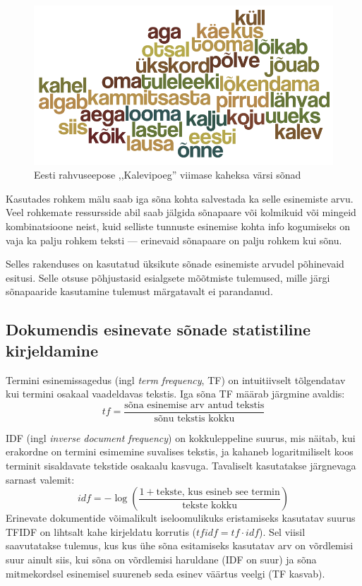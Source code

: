 \documentclass[]{trkuur}
\let\eng\emph
\begin{document}
\begin{figure}[h!]
\includegraphics[width=0.9\linewidth]{klpgv}
\caption{Eesti rahvuseepose ,,Kalevipoeg'' viimase kaheksa värsi sõnad}
\label{klpgv}
\end{figure}

Kasutades rohkem mälu saab iga sõna kohta salvestada ka selle esinemiste arvu.
Veel rohkemate ressursside abil saab jälgida sõnapaare või kolmikuid või mingeid
kombinatsioone neist, kuid selliste tunnuste esinemise kohta info kogumiseks on
vaja ka palju rohkem teksti --- erinevaid sõnapaare on palju rohkem kui sõnu.

Selles rakenduses on kasutatud üksikute sõnade esinemiste arvudel põhinevaid
esitusi. Selle otsuse põhjustasid esialgsete mõõtmiste tulemused, mille järgi
sõnapaaride kasutamine tulemust märgatavalt ei parandanud.

\subsection{Dokumendis esinevate sõnade statistiline kirjeldamine}
\label{tfsec}
Termini esinemissagedus (ingl \eng{term frequency}, TF) on intuitiivselt
tõlgendatav kui termini osakaal vaadeldavas tekstis.
Iga sõna TF määrab järgmine avaldis:
\[ tf = \frac{\text{sõna esinemise arv antud tekstis}}{\text{sõnu tekstis
kokku}} \]
\autocite{wiki-term-frequency}
\autocite{peroneTF}

\label{tfidfsec}
IDF (ingl \eng{inverse document frequency}) 
on kokkuleppeline suurus, mis näitab, kui erakordne on termini esimemine suvalises
tekstis, ja kahaneb logaritmiliselt koos terminit sisaldavate tekstide osakaalu
kasvuga.
Tavaliselt kasutatakse järgnevaga sarnast valemit:
\[ idf = -\log \left(\frac{1+\text{tekste, kus esineb see termin}}{\text{tekste kokku}} \right) \] 
Erinevate dokumentide võimalikult iseloomulikuks eristamiseks kasutatav suurus
TFIDF on lihtsalt kahe kirjeldatu korrutis (\(tfidf = tf \cdot idf \)).
Sel viisil saavutatakse tulemus, kus kus ühe sõna esitamiseks kasutatav arv on
võrdlemisi suur ainult siis, kui sõna on võrdlemisi haruldane (IDF on suur) ja
sõna mitmekordsel esinemisel suureneb seda esinev väärtus veelgi (TF kasvab).
\autocite{wiki-term-frequency}
\autocite{peroneTFIDF}
\end{document}
